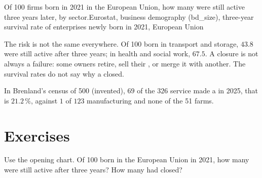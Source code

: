 \begin{omchart}{Of 100 firms born in 2021 in the European Union, how many were still active
three years later, by sector.}{Eurostat, business demography (bd\_size), three-year survival
rate of enterprises newly born in 2021, European Union}
\end{omchart}

The risk is not the same everywhere. Of 100  born in transport and storage, $43.8$ were
still active after three years; in health and social work, $67.5$. A closure is not always a
failure: some owners retire, sell their , or merge it with another. The survival rates do not
say why a  closed.

In Brenland's census of 500  (invented), $69$ of the $326$ service  made a  in
2025, that is $21.2\,\%$, against $1$ of $123$ manufacturing  and none of the 51 farms.

\section{Exercises}

\begin{exercise}[$\star$]\label{exo:g7:firms:1}
Use the opening chart. Of 100  born in the European Union in 2021, how many were still
active after three years? How many had closed?
\end{exercise}

